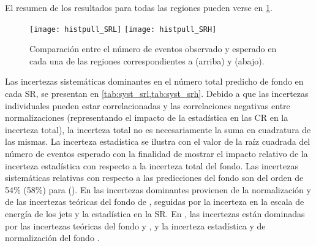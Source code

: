 El resumen de los resultados para todas las regiones pueden verse en
\cref{fig:fit_region_composition}.

\begin{figure}[!htbp]
  \centering

  \texttt{[image: histpull\_SRL]}
  \texttt{[image: histpull\_SRH]}

  \caption{Comparación entre el número de eventos observado y esperado en cada
    una de las regiones correspondientes a {\SRL} (arriba) y {\SRH} (abajo).}

  \label{fig:fit_region_composition}

\end{figure}


Las incertezas sistemáticas dominantes en el número total predicho de fondo en
cada SR, se presentan en \cref{tab:syst_srl,tab:syst_srh}.
Debido a que las incertezas individuales pueden estar correlacionadas y las
correlaciones negativas entre normalizaciones (representando el impacto de la
estadística en las CR en la incerteza total), la incerteza total no es
necesariamente la suma en cuadratura de las mismas. La incerteza estadística se
ilustra con el valor de la raíz cuadrada del número de eventos esperado con la
finalidad de mostrar el impacto relativo de la incerteza estadística con
respecto a la incerteza total del fondo. Las incertezas sistemáticas relativas
con respecto a las predicciones del fondo son del orden de 54\% (58\%) para
{\SRL} (\SRH). En {\SRL} las incertezas dominantes provienen de la normalización
y de las incertezas teóricas del fondo de {\ttgam}, seguidas por la incerteza en
la escala de energía de los jets y la estadística en la SR. En {\SRH}, las
incertezas están dominadas por las incertezas teóricas del fondo {\zgam} y
{\gjet}, y la incerteza estadística y de normalización del fondo {\wgam}.


